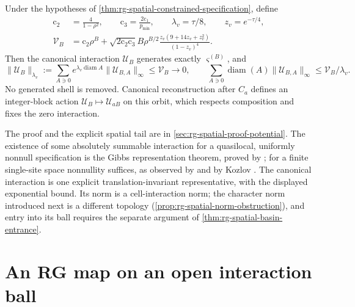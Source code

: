 Under the hypotheses of \cref{thm:rg-spatial-constrained-specification},
define
\begin{equation}
 \begin{split}
 \mathrm c_2&=\frac4{1-\rho^2},\qquad \mathrm c_3=\frac{2\mathrm c_1}{p_{\min}},\qquad
 \lambda_v=\tau/8,\qquad z_v=e^{-\tau/4},\\
 \mathcal V_B&=\mathrm c_2\rho^B+\sqrt{2\mathrm c_2\mathrm c_3}B\rho^{B/2}
 \frac{z_v(9+14z_v+z_v^2)}{(1-z_v)^4}.
 \end{split}
 \label{eq:rg-spatial-vacuum-bound}
\end{equation}
Then the canonical interaction \(\mathscr U_B\) generates exactly
\(\varsigma^{(B)}\), and
\begin{equation}
 \|\mathscr U_B\|_{\lambda_v}
 :=\sum_{A\ni0}e^{\lambda_v\operatorname{diam}A}
                   \|\mathscr U_{B,A}\|_\infty
 \le\mathcal V_B\longrightarrow0,
 \qquad
 \sum_{A\ni0}\operatorname{diam}(A)\|\mathscr U_{B,A}\|_\infty
 \le\mathcal V_B/\lambda_v.
 \label{eq:rg-spatial-vacuum-norm}
\end{equation}
No generated shell is removed. Canonical reconstruction after \(C_a\)
defines an integer-block action \(\mathscr U_B\mapsto\mathscr U_{aB}\) on this orbit,
which respects composition and fixes the zero interaction.

The proof and the explicit spatial tail are in
\cref{sec:rg-spatial-proof-potential}. The existence of some absolutely
summable interaction for a quasilocal, uniformly nonnull specification is
the Gibbs representation theorem, proved by \citet{Kozlov1974}; for a
finite single-site space nonnullity suffices, as observed by
\citet{Sullivan1973} and by Kozlov
\citep[Sec.~2.3.3, Thm.~2.12]{VanEnterFernandezSokal1993}. The canonical
interaction is one explicit
translation-invariant representative, with the displayed exponential bound.
Its norm is a cell-interaction norm; the character norm introduced next is
a different topology (\cref{prop:rg-spatial-norm-obstruction}), and entry
into its ball requires the separate argument of
\cref{thm:rg-spatial-basin-entrance}.

\section{An RG map on an open interaction ball}
\label{sec:rg-spatial-open-ball}

